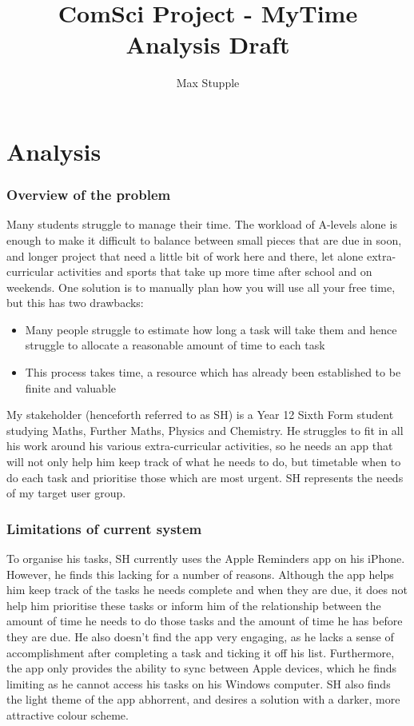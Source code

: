 \documentclass{article}
\title{ComSci Project - MyTime\\Analysis Draft}
\author{Max Stupple}
\date{}
\begin{document}
    
\maketitle{}

\part{Analysis}
\section{Overview of the problem}
Many students struggle to manage their time. The workload of A-levels alone is
enough to make it difficult to balance between small pieces that are due in
soon, and longer project that need a little bit of work here and there, let
alone extra-curricular activities and sports that take up more time after school
and on weekends. One solution is to manually plan how you will use all your free
time, but this has two drawbacks:
        
\begin{itemize}
\item Many people struggle to estimate how long a task will take them and hence
  struggle to allocate a reasonable amount of time to each task
\item This process takes time, a resource which has already been established to
  be finite and valuable
\end{itemize}

My stakeholder (henceforth referred to as SH) is a Year 12 Sixth Form student
studying Maths, Further Maths, Physics and Chemistry. He struggles to fit in all
his work around his various extra-curricular activities, so he needs an app that
will not only help him keep track of what he needs to do, but timetable when to
do each task and prioritise those which are most urgent. SH represents the needs
of my target user group.

\section{Limitations of current system}
To organise his tasks, SH currently uses the Apple Reminders app on his iPhone.
However, he finds this lacking for a number of reasons. Although the app helps
him keep track of the tasks he needs complete and when they are due, it does not
help him prioritise these tasks or inform him of the relationship between the
amount of time he needs to do those tasks and the amount of time he has before
they are due. He also doesn't find the app very engaging, as he lacks a sense of
accomplishment after completing a task and ticking it off his list. Furthermore,
the app only provides the ability to sync between Apple devices, which he finds
limiting as he cannot access his tasks on his Windows computer. SH also finds
the light theme of the app abhorrent, and desires a solution with a darker, more
attractive colour scheme.
\end{document}
